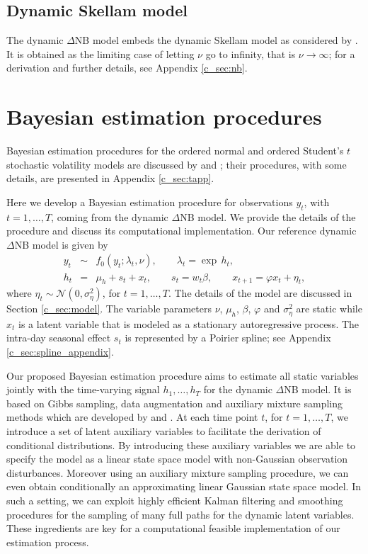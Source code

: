 \documentclass[12pt]{article}
\begin{document}
\subsection{Dynamic Skellam model}

The dynamic $\Delta$NB model embeds the dynamic Skellam model as
considered by \citet{KoopmanLucasLit2014}. It is obtained as the limiting case of
letting $\nu$ go to infinity, that is $\nu \rightarrow \infty$;
for a derivation and further details, see Appendix \ref{c_sec:nb}.



\section{Bayesian estimation procedures}
\label{c_sec:estimation}

Bayesian estimation procedures for the ordered normal and ordered
Student's $t$ stochastic volatility models are discussed by
\citet{MullerCzado2006} and \citet{Stefanos2015};
their procedures, with some details, are presented in Appendix \ref{c_sec:tapp}.

Here we develop a Bayesian estimation procedure for observations
$y_t$, with $t=1,\ldots,T$, coming from
the dynamic $\Delta$NB model. We provide the details of the procedure and
discuss its computational implementation.
Our reference dynamic $\Delta$NB model is given by
\begin{eqnarray}
y_t &\sim & f_{0}(y_t ; \lambda_t,  \nu),  \qquad \lambda _t = \exp \, h_t, \\ \nonumber
h_t &=& \mu_h + s_t +x_t , \qquad
s_t = w_t \beta , \qquad
x_{t+1} = \varphi x_t + \eta_t, \nonumber
\end{eqnarray}
where $\eta_t \sim \mathcal{N}\left(0, \sigma^{2}_{\eta}\right)$, for $t=1,\ldots,T$.
The details of the model are discussed in Section \ref{c_sec:model}. The
variable parameters $\nu$, $\mu _h$, $\beta$, $\varphi$ and $\sigma _{\eta} ^2$ are
static while $x_t$ is a latent variable that is modeled as a stationary autoregressive process.
The intra-day seasonal effect $s_t$ is represented by a Poirier spline;
see Appendix \ref{c_sec:spline_appendix}.

Our proposed Bayesian estimation procedure aims to estimate all static variables jointly with the
time-varying signal $h_1,\ldots, h_T$ for the dynamic $\Delta$NB model.
It is based on Gibbs sampling,
data augmentation and auxiliary mixture sampling
methods which are developed by \citet{SFSWagner2006} and \citet{SFSFHeldRue2009}.
At each time point $t$, for $t=1,\ldots,T$,
we introduce a set of latent auxiliary variables
to facilitate the derivation of conditional distributions.
By introducing these auxiliary variables 
we are able to specify the model as a linear state space model
with non-Gaussian observation disturbances. Moreover 
using an auxiliary mixture sampling procedure, we can even obtain  conditionally
an approximating linear Gaussian state space model.
In such a setting, we can exploit highly efficient Kalman filtering and
smoothing procedures for the sampling of many full paths for the dynamic latent
variables.
These ingredients are key for a computational feasible implementation
of our estimation process.
\end{document}
